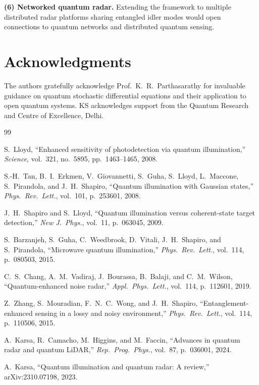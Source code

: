 \documentclass[journal]{IEEEtran}
\begin{document}
\textbf{(6) Networked quantum radar.} Extending the framework to multiple distributed radar platforms sharing entangled idler modes would open connections to quantum networks and distributed quantum sensing.


\section*{Acknowledgments}

The authors gratefully acknowledge Prof.~K.~R.~Parthasarathy for invaluable guidance on quantum stochastic differential equations and their application to open quantum systems. KS acknowledges support from the Quantum Research and Centre of Excellence, Delhi.


\begin{thebibliography}{99}

S.~Lloyd, ``Enhanced sensitivity of photodetection via quantum illumination,'' \textit{Science}, vol.~321, no.~5895, pp.~1463--1465, 2008.

S.-H.~Tan, B.~I.~Erkmen, V.~Giovannetti, S.~Guha, S.~Lloyd, L.~Maccone, S.~Pirandola, and J.~H.~Shapiro, ``Quantum illumination with Gaussian states,'' \textit{Phys.\ Rev.\ Lett.}, vol.~101, p.~253601, 2008.

J.~H.~Shapiro and S.~Lloyd, ``Quantum illumination versus coherent-state target detection,'' \textit{New J.\ Phys.}, vol.~11, p.~063045, 2009.

S.~Barzanjeh, S.~Guha, C.~Weedbrook, D.~Vitali, J.~H.~Shapiro, and S.~Pirandola, ``Microwave quantum illumination,'' \textit{Phys.\ Rev.\ Lett.}, vol.~114, p.~080503, 2015.

C.~S.~Chang, A.~M.~Vadiraj, J.~Bourassa, B.~Balaji, and C.~M.~Wilson, ``Quantum-enhanced noise radar,'' \textit{Appl.\ Phys.\ Lett.}, vol.~114, p.~112601, 2019.

Z.~Zhang, S.~Mouradian, F.~N.~C.~Wong, and J.~H.~Shapiro, ``Entanglement-enhanced sensing in a lossy and noisy environment,'' \textit{Phys.\ Rev.\ Lett.}, vol.~114, p.~110506, 2015.

A.~Karsa, R.~Camacho, M.~Higgins, and M.~Faccin, ``Advances in quantum radar and quantum LiDAR,'' \textit{Rep.\ Prog.\ Phys.}, vol.~87, p.~036001, 2024.

A.~Karsa, ``Quantum illumination and quantum radar: A review,'' arXiv:2310.07198, 2023.


\end{thebibliography}
\end{document}
